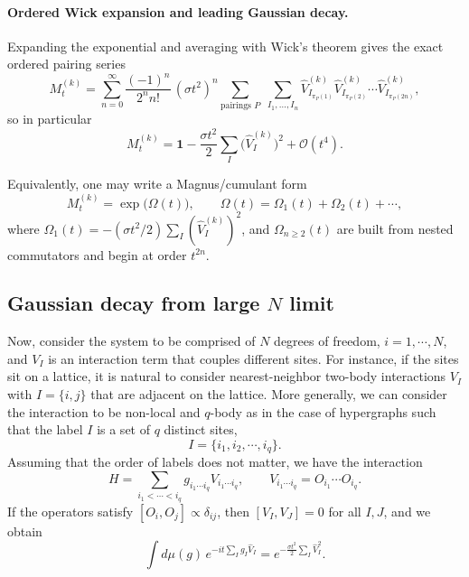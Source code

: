 \documentclass{article}
\theoremstyle{definition}
\begin{document}
    \paragraph{Ordered Wick expansion and leading Gaussian decay.}
    Expanding the exponential and averaging with Wick's theorem gives the exact ordered
    pairing series
    \begin{equation}
        M_{t}^{(k)}= \sum_{n=0}^{\infty}\frac{(-1)^{n}}{2^{n}n!}\,(\sigma t^{2})^{n}
        \sum_{\text{pairings }P}\; \sum_{I_1,\dots,I_n}\widehat V_{I_{\pi_P(1)}}^{(k)}
        \widehat V_{I_{\pi_P(2)}}^{(k)}\cdots \widehat V_{I_{\pi_P(2n)}}^{(k)}, \label{eq:ordered_wick_quenched}
    \end{equation}
    so in particular
    \begin{equation}
        M_{t}^{(k)}= \mathbf{1}-\frac{\sigma t^{2}}{2}\sum_{I}\big(\widehat V_{I}
        ^{(k)}\big)^{2}+\mathcal{O}(t^{4}). \label{eq:Mt_smallt}
    \end{equation}

    Equivalently, one may write a Magnus/cumulant form
    \begin{equation}
        M_{t}^{(k)}=\exp\!\big(\Omega(t)\big), \qquad \Omega(t)=\Omega_{1}(t)+\Omega
        _{2}(t)+\cdots,
    \end{equation}
    where $\Omega_{1}(t)=-(\sigma t^{2}/2)\sum_{I}(\widehat V_{I}^{(k)})^{2}$,
    and $\Omega_{n\ge 2}(t)$ are built from nested commutators and begin at
    order $t^{2n}$.

\subsection{Gaussian decay from large $N$ limit}

Now, consider the system to be comprised of $N$ degrees of freedom,
$i=1,\cdots,N$, and $V_I$ is an interaction term that couples different
sites. For instance, if the sites sit on a lattice, it is natural to consider
nearest-neighbor two-body interactions $V_I$ with $I=\{i,j\}$ that are
adjacent on the lattice. More generally, we can consider the interaction to
be non-local and $q$-body as in the case of hypergraphs such that the label
$I$ is a set of $q$ distinct sites,
\begin{equation}
    I=\{i_1,i_2,\cdots,i_q\}.
\end{equation}
Assuming that the order of labels does not matter, we have the interaction
\begin{equation}
    H
    =
    \sum_{i_1<\cdots<i_q}
    g_{i_1\cdots i_q}V_{i_1\cdots i_q},
    \qquad
    V_{i_1\cdots i_q}
    =
    O_{i_1}\cdots O_{i_q}.
    \label{eq:qbody_general}
\end{equation}
If the operators satisfy $[O_i,O_j]\propto\delta_{ij}$, then
$[V_I,V_J]=0$ for all $I,J$, and we obtain
\begin{equation}
    \int d\mu(g)\,
    e^{-it\sum_I g_I\widehat V_I}
    =
    e^{-\frac{\sigma t^2}{2}
    \sum_I\widehat V_I^2}.
    \label{eq:qbody_commuting_gaussian}
\end{equation}
\end{document}

